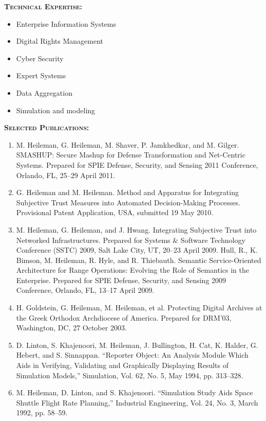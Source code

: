 \documentclass{sbir}
\begin{document}
\vspace{-18pt}
{\textcolor{black}{\makebox[6.5in]{\hrulefill}} 
\textbf{\textsc{Technical Expertise:}}
\vspace{-8pt}
\begin{multicols}{2}
 \begin{itemize}
  \item Enterprise Information Systems
  \item Digital Rights Management
  \item Cyber Security
  \item Expert Systems
  \item Data Aggregation
  \item Simulation and modeling	
 \end{itemize}
\end{multicols}
\vspace{-16pt}
\textbf{\textsc{Selected Publications:}}
\vspace{-8pt}
\begin{enumerate}
\item M. Heileman, G. Heileman, M. Shaver, P. Jamkhedkar, and M. Gilger. SMASHUP: Secure Mashup for Defense Transformation and Net-Centric Systems. Prepared for SPIE Defense, Security, and Sensing 2011 Conference, Orlando, FL, 25--29 April 2011.
\item G. Heileman and M. Heileman. Method and Apparatus for Integrating Subjective Trust Measures into Automated Decision-Making Processes. Provisional Patent Application, USA, submitted 19 May 2010.
\item M. Heileman, G. Heileman, and J. Hwang. Integrating Subjective Trust into Networked Infrastructures. Prepared for Systems \& Software Technology Conference (SSTC) 2009, Salt Lake City, UT, 20--23 April 2009.
Hull, R., K. Bimson, M. Heileman, R. Hyle, and R. Thiebauth. Semantic Service-Oriented Architecture for Range Operations: Evolving the Role of Semantics in the Enterprise. Prepared for SPIE Defense, Security, and Sensing 2009 Conference, Orlando, FL, 13--17 April 2009.
\item H. Goldstein, G. Heileman, M. Heileman, et al. Protecting Digital Archives at the Greek Orthodox Archdiocese of America. Prepared for DRM'03, Washington, DC, 27 October 2003.
\item D. Linton, S. Khajenoori, M. Heileman, J. Bullington, H. Cat, K. Halder, G. Hebert, and S. Sinnappan. ``Reporter Object: An Analysis Module Which Aids in Verifying, Validating and Graphically Displaying Results of Simulation Models,'' Simulation, Vol. 62, No. 5, May 1994, pp. 313--328.
\item M. Heileman, D. Linton, and S. Khajenoori. ``Simulation Study Aids Space Shuttle Flight Rate Planning,'' Industrial Engineering, Vol. 24, No. 3, March 1992, pp. 58--59.
\end{enumerate}

}
\end{document}
